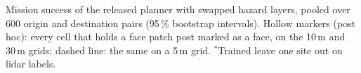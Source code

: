 Mission success of the released planner with swapped hazard layers, pooled over 600 origin and destination pairs (95\,\% bootstrap intervals). Hollow markers (post hoc): every cell that holds a face patch post marked as a face, on the 10\,m and 30\,m grids; dashed line: the same on a 5\,m grid. $^{*}$Trained leave one site out on lidar labels.
